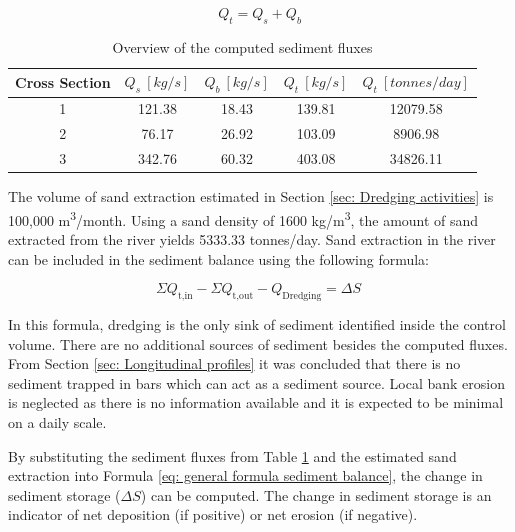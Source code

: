 \begin{equation}
    Q_t = Q_s + Q_b
    \label{eq: Total sediment flux}
\end{equation}

\begin{table}[H]
    \centering
    \caption{Overview of the computed sediment fluxes}
    \label{tab: Overview sediment fluxes}
    \setlength{\tabcolsep}{8pt}
    \begin{tabular}{c c c c c}
        \hline
        Cross Section & $Q_s~[kg/s]$ & $Q_b~[kg/s]$ & $Q_t~[kg/s]$ &  $Q_t~[tonnes/day]$ \\
        \hline
        1 & 121.38 &  18.43 & 139.81 & 12079.58\\
        2 & 76.17  &  26.92 & 103.09 & 8906.98\\
        3 & 342.76 & 60.32 & 403.08 & 34826.11\\
        \hline
    \end{tabular}
\end{table}

The volume of sand extraction estimated in Section \ref{sec: Dredging activities} is 100,000 m\textsuperscript{3}/month. Using a sand density of 1600 kg/m\textsuperscript{3}, the amount of sand extracted from the river yields 5333.33 tonnes/day. Sand extraction in the river can be included in the sediment balance using the following formula:

\begin{equation}
    \Sigma Q_\text{t,in}  - \Sigma Q_\text{t,out} - Q_\text{Dredging}  = \Delta S \
    \label{eq: general formula sediment balance}
\end{equation}

In this formula, dredging is the only sink of sediment identified inside the control volume. There are no additional sources of sediment besides the computed fluxes. From Section \ref{sec: Longitudinal profiles} it was concluded that there is no sediment trapped in bars which can act as a sediment source. Local bank erosion is neglected as there is no information available and it is expected to be minimal on a daily scale.

By substituting the sediment fluxes from Table \ref{tab: Overview sediment fluxes} and the estimated sand extraction into Formula \ref{eq: general formula sediment balance}, the 
change in sediment storage ($\Delta S$) can be computed. The change in sediment storage is an indicator of net deposition (if positive) or net erosion (if negative).

